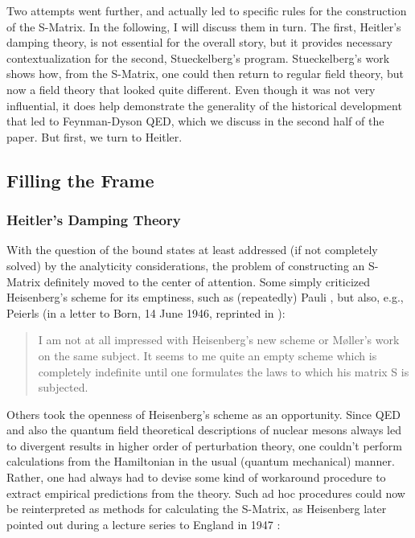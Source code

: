 \documentclass[12pt]{article}
\begin{document}
Two attempts went further, and actually led to specific rules for the construction of the S-Matrix. In the following, I will discuss them in turn. The first, Heitler's damping theory, is not essential for the overall story, but it provides necessary contextualization for the second, Stueckelberg's program. Stueckelberg's work shows how, from the S-Matrix, one could then return to regular field theory, but now a field theory that looked quite different. Even though it was not very influential, it does help demonstrate the generality of the historical development that led to Feynman-Dyson QED, which we discuss in the second half of the paper. But first, we turn to Heitler.

\subsection{Filling the Frame}

\subsubsection{Heitler's Damping Theory}

With the question of the bound states at least addressed (if not completely solved) by the analyticity considerations, the problem of constructing an S-Matrix definitely moved to the center of attention. Some simply criticized Heisenberg's scheme for its emptiness, such as (repeatedly) Pauli \citep[p. 564-567]{rechenberg_1989_the-early}, but also, e.g., Peierls (in a letter to Born, 14 June 1946, reprinted in \citep[p. 58]{lee_2009_sir}):

\begin{quote}
I am not at all impressed with Heisenberg's new scheme or M\o ller's work on the same subject. It seems to me quite an empty scheme which is completely indefinite until one formulates the laws to which his matrix S is subjected.
\end{quote}

Others took the openness of Heisenberg's scheme as an opportunity. Since QED and also the quantum field theoretical descriptions of nuclear mesons always led to divergent results in higher order of perturbation theory, one couldn't perform calculations from the Hamiltonian in the usual (quantum mechanical) manner. Rather, one had always had to devise some kind of workaround procedure to extract empirical predictions from the theory. Such ad hoc procedures could now be reinterpreted as methods for calculating the S-Matrix, as Heisenberg later pointed out during a lecture series to England in 1947 \citep[p. 20]{heisenberg_1949_the-present}:
\end{document}
